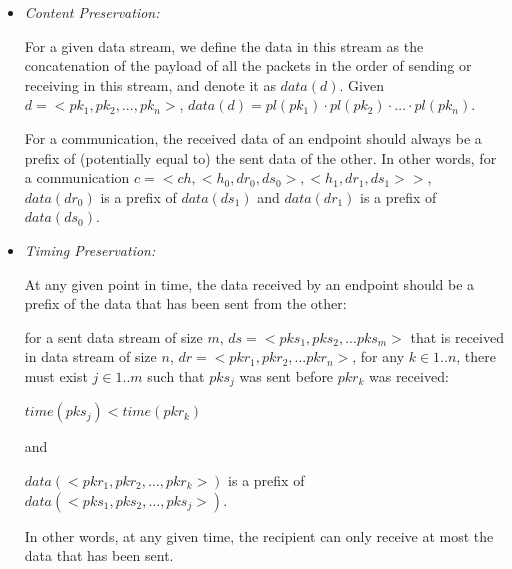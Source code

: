 \begin{itemize}
 \item \textit{Content Preservation:} 

 For a given data stream, we define the data in this stream as the concatenation of the payload of all the packets in the order of sending or receiving in this stream, and denote it as $data(d)$. Given $ d=<pk_1, pk_2, ..., pk_n>$, $data(d)=pl(pk_1) \cdot pl(pk_2)\cdot \ldots \cdot pl(pk_n)$.
 
 For a communication, the received data of an endpoint should always be a prefix of (potentially equal to) the sent data of the other. In other words, for a communication $c = <ch, <h_0, dr_0, ds_0>, <h_1, dr_1, ds_1>>$, $data(dr_0)$ is a prefix of $data(ds_1)$ and $data(dr_1)$ is a prefix of $data(ds_0)$.

\item \textit{Timing Preservation:} 
 
At any given point in time, the data received by an endpoint should be a prefix of the data that has been sent from the other:
 
for a sent data stream of size $m$, $ds= <pks_1, pks_2, ... pks_m>$ that is received in data stream of size $n$, $dr = <pkr_1, pkr_2, ... pkr_n>$, for any $k \in {1..n}$, there must exist $j \in {1..m}$ such that $pks_j$ was sent before $pkr_k$ was received:

$time(pks_j) < time(pkr_k)$

and

$ data(<pkr_1, pkr_2, ..., pkr_k>)$ is a prefix of $data(<pks_1, pks_2, ..., pks_j>)$.

In other words, at any given time, the recipient can only receive at most the data that has been sent.

\end{itemize}

